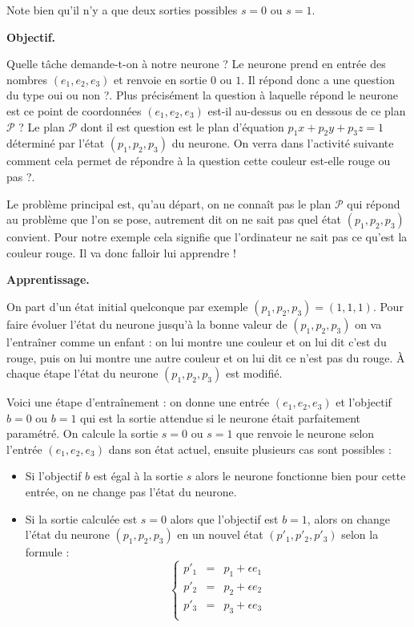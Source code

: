 \documentclass[10pt,class=report,crop=false]{standalone}
\begin{document}
\begin{cours}[Neurone]
Note bien qu'il n'y a que deux sorties possibles $s=0$ ou $s=1$.

\medskip
\textbf{Objectif.}

Quelle tâche demande-t-on à notre neurone ? Le neurone prend en entrée des nombres $(e_1,e_2,e_3)$ et renvoie en sortie $0$ ou $1$. Il répond donc a une question du type \og{}oui ou non ?\fg{}.
Plus précisément la question à laquelle répond le neurone est \og{}ce point de coordonnées $(e_1,e_2,e_3)$ est-il au-dessus ou en dessous de ce plan $\mathcal{P}$ ?\fg{} Le plan $\mathcal{P}$ dont il est question est le plan d'équation $p_1x+p_2y+p_3z=1$ déterminé par l'état $(p_1,p_2,p_3)$ du neurone.
On verra dans l'activité suivante comment cela permet de répondre à la question \og{}cette couleur est-elle rouge ou pas ?\fg{}.

Le problème principal est, qu'au départ, on ne connaît pas le plan $\mathcal{P}$ qui répond au problème que l'on se pose, autrement dit on ne sait pas quel état $(p_1,p_2,p_3)$ convient. Pour notre exemple cela signifie que l'ordinateur ne sait pas ce qu'est la couleur rouge. Il va donc falloir lui apprendre !

\medskip
\textbf{Apprentissage.}

On part d'un état initial quelconque par exemple $(p_1,p_2,p_3)=(1,1,1)$.
Pour faire évoluer l'état du neurone jusqu'à la bonne valeur de $(p_1,p_2,p_3)$ on 
va l'entraîner comme un enfant : on lui montre une couleur et on lui dit \og{}c'est du rouge\fg{}, puis on lui montre une autre couleur et on lui dit \og{}ce n'est pas du rouge\fg{}.
\`A chaque étape l'état du neurone $(p_1,p_2,p_3)$ est modifié.

Voici une étape d'entraînement : on donne une entrée $(e_1,e_2,e_3)$ et l'objectif $b=0$ ou $b=1$ qui est la sortie attendue si le neurone était parfaitement paramétré.
On calcule la sortie $s=0$ ou $s=1$ que renvoie le neurone selon l'entrée $(e_1,e_2,e_3)$ dans son état actuel, ensuite plusieurs cas sont possibles :
\begin{itemize} 
	\item Si l'objectif $b$ est égal à la sortie $s$ alors le neurone fonctionne bien pour cette entrée, on ne change pas l'état du neurone.
	
	\item Si la sortie calculée est $s=0$ alors que l'objectif est $b=1$, alors on change l'état du neurone $(p_1,p_2,p_3)$ en un nouvel état $(p'_1,p'_2,p'_3)$ selon la formule :
$$\left\{ 
\begin{array}{rcl}
p'_1 &=& p_1 + \epsilon e_1 \\
p'_2 &=& p_2 + \epsilon e_2 \\
p'_3 &=& p_3 + \epsilon e_3 \\
\end{array}
\right.$$			


\end{itemize}
\end{cours}
\end{document}
